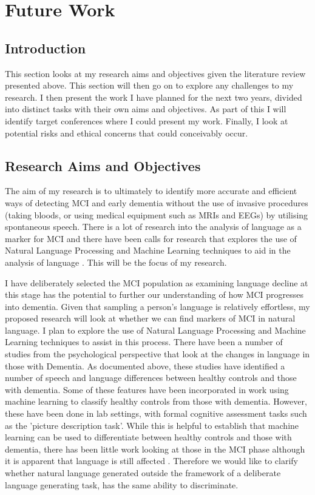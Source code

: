 \documentclass[10pt, letterpaper, twoside, openany]{book}
\begin{document}
\chapter{Future Work}
\section{Introduction}
This section looks at my research aims and objectives given the literature review presented above. This section will then go on to explore any challenges to my research. I then present the work I have planned for the next two years, divided into distinct tasks with their own aims and objectives. As part of this I will identify target conferences where I could present my work. Finally, I look at potential risks and ethical concerns that could conceivably occur.
\section{Research Aims and Objectives}
The aim of my research is to ultimately to identify more accurate and efficient ways of detecting MCI and early dementia without the use of invasive procedures (taking bloods, or using medical equipment such as MRIs and EEGs) by utilising spontaneous speech. There is a lot of research into the analysis of language as a marker for MCI \cite{Taler2008, Boschi2017} and there have been calls for research that explores the use of Natural Language Processing and Machine Learning techniques to aid in the analysis of language \cite{Boschi2017}. This will be the focus of my research.
\par
I have deliberately selected the MCI population as examining language decline at this stage has the potential to further our understanding of how MCI progresses into dementia. Given that sampling a person's language is relatively effortless, my proposed research will look at whether we can find markers of MCI in natural language. I plan to explore the use of Natural Language Processing and Machine Learning techniques to assist in this process. There have been a number of studies from the psychological perspective that look at the changes in language in those with Dementia. As documented above, these studies have identified a number of speech and language differences between healthy controls and those with dementia. Some of these features have been incorporated in work using machine learning to classify healthy controls from those with dementia. However, these have been done in lab settings, with formal cognitive assessment tasks such as the 'picture description task'. While this is helpful to establish that machine learning can be used to differentiate between healthy controls and those with dementia, there has been little work looking at those in the MCI phase although it is apparent that language is still affected \cite{Berisha2015, Snowdon1996, Le2011}. Therefore we would like to clarify whether natural language generated outside the framework of a deliberate language generating task, has the same ability to discriminate.
\end{document}
